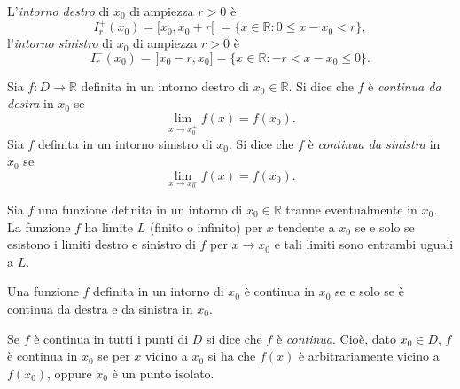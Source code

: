 \documentclass[11pt,a4paper]{article}
\begin{document}
\begin{definizione}
L'\emph{intorno destro} di $x_0$ di ampiezza $r > 0$ è
\[
I_r^+(x_0) = [x_0, x_0 + r[ \;= \{x \in \mathbb{R} : 0 \le x - x_0 < r\},
\]
l'\emph{intorno sinistro} di $x_0$ di ampiezza $r > 0$ è
\[
I_r^-(x_0) = \,]x_0 - r, x_0] = \{x \in \mathbb{R} : -r < x - x_0 \le 0\}.
\]
\end{definizione}

\begin{definizione}
Sia $f : D \to \mathbb{R}$ definita in un intorno destro di $x_0 \in \mathbb{R}$. Si dice che $f$ è \emph{continua da destra} in $x_0$ se
\[
\lim_{x\to x_0^+} f(x) = f(x_0).
\]
Sia $f$ definita in un intorno sinistro di $x_0$. Si dice che $f$ è \emph{continua da sinistra} in $x_0$ se
\[
\lim_{x\to x_0^-} f(x) = f(x_0).
\]
\end{definizione}

\begin{proposizione}
Sia $f$ una funzione definita in un intorno di $x_0 \in \mathbb{R}$ tranne eventualmente in $x_0$. La funzione $f$ ha limite $L$ (finito o infinito) per $x$ tendente a $x_0$ se e solo se esistono i limiti destro e sinistro di $f$ per $x \to x_0$ e tali limiti sono entrambi uguali a $L$.

Una funzione $f$ definita in un intorno di $x_0$ è continua in $x_0$ se e solo se è continua da destra e da sinistra in $x_0$.
\end{proposizione}

Se $f$ è continua in tutti i punti di $D$ si dice che $f$ è \emph{continua}. Cioè, dato $x_0 \in D$, $f$ è continua in $x_0$ se per $x$ vicino a $x_0$ si ha che $f(x)$ è arbitrariamente vicino a $f(x_0)$, oppure $x_0$ è un punto isolato.
\end{document}
